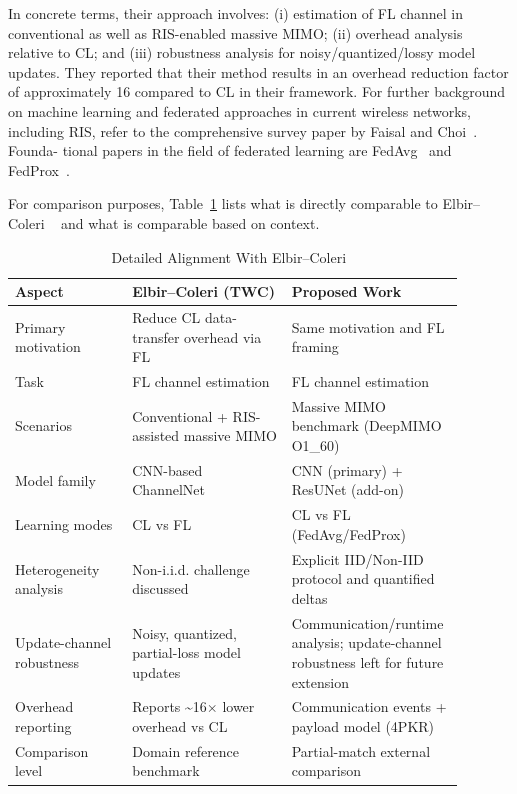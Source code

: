 \documentclass{llncs}
\begin{document}
In concrete terms, their approach involves: (i) estimation of FL channel in conventional as well as RIS-enabled massive MIMO; (ii) overhead analysis relative to CL; and (iii) robustness analysis for noisy/quantized/lossy model updates.
They reported that their method results in an overhead reduction factor of approximately 16 compared to CL in their framework. For further background on machine learning and federated approaches in current wireless networks, including RIS, refer to the comprehensive survey paper by Faisal and Choi~\cite{faisal2022rismlsurvey}. Founda-
tional papers in the field of federated learning are FedAvg~\cite{mcmahan2017fedavg} and FedProx~\cite{li2020fedprox}.


For comparison purposes,  Table~\ref{tab:alignment_ec} lists what is directly comparable to
Elbir–Coleri ~\cite{elbir2021flchannel} and what is comparable based on context.

\begin{table}[H]
\caption{Detailed Alignment With Elbir--Coleri~\cite{elbir2021flchannel}}
\label{tab:alignment_ec}
\centering
\begin{tabular}{p{0.25\linewidth}p{0.34\linewidth}p{0.30\linewidth}}
\toprule
Aspect & Elbir--Coleri (TWC) & Proposed Work \\
\midrule
Primary motivation & Reduce CL data-transfer overhead via FL & Same motivation and FL framing \\
Task & FL channel estimation & FL channel estimation \\
Scenarios & Conventional + RIS-assisted massive MIMO & Massive MIMO benchmark (DeepMIMO O1\_60) \\
Model family & CNN-based ChannelNet & CNN (primary) + ResUNet (add-on) \\
Learning modes & CL vs FL & CL vs FL (FedAvg/FedProx) \\
Heterogeneity \newline analysis & Non-i.i.d. challenge discussed & Explicit IID/Non-IID protocol and quantified deltas \\
Update-channel \newline robustness & Noisy, quantized, partial-loss model updates & Communication/runtime analysis; update-channel robustness left for future extension \\
Overhead reporting & Reports \textasciitilde16$\times$ lower overhead vs CL & Communication events + payload model (4PKR) \\
Comparison level & Domain reference benchmark & Partial-match external comparison \\
\bottomrule
\end{tabular}
\end{table}
\end{document}
